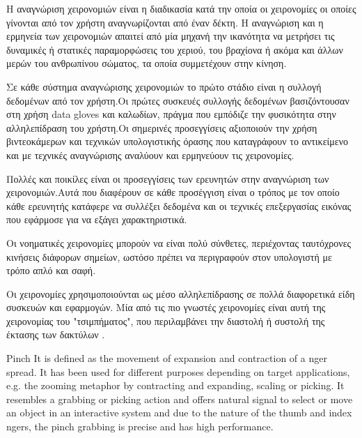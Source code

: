 
H αναγνώριση χειρονομιών είναι η διαδικασία κατά την οποία οι χειρονομίες οι οποίες γίνονται από τον χρήστη αναγνωρίζονται από έναν δέκτη. Η αναγνώριση και η ερμηνεία των χειρονομιών απαιτεί από μία μηχανή την ικανότητα να μετρήσει τις δυναμικές ή στατικές παραμορφώσεις του χεριού, του βραχίονα ή ακόμα και άλλων μερών του ανθρωπίνου σώματος, τα οποία συμμετέχουν στην κίνηση.

Σε κάθε σύστημα αναγνώρισης χειρονομιών το πρώτο στάδιο είναι η συλλογή δεδομένων από τον χρήστη.Οι πρώτες συσκευές συλλογής δεδομένων βασιζόντουσαν στη χρήση data gloves και καλωδίων, πράγμα που εμπόδιζε την φυσικότητα στην αλληλεπίδραση του χρήστη.Οι σημερινές προσεγγίσεις αξιοποιούν την χρήση βιντεοκάμερων και τεχνικών υπολογιστικής όρασης που καταγράφουν το αντικείμενο και με τεχνικές αναγνώρισης αναλύουν και ερμηνεύουν τις χειρονομίες.

Πολλές και ποικίλες είναι οι προσεγγίσεις των ερευνητών στην αναγνώριση των χειρονομιών.Αυτά που διαφέρουν σε κάθε προσέγγιση είναι ο τρόπος με τον οποίο κάθε ερευνητής κατάφερε να συλλέξει δεδομένα και οι τεχνικές επεξεργασίας εικόνας που εφάρμοσε για να εξάγει χαρακτηριστικά.

Οι νοηματικές χειρονομίες μπορούν να είναι πολύ σύνθετες, περιέχοντας ταυτόχρονες κινήσεις διάφορων σημείων, ωστόσο πρέπει να περιγραφούν στον υπολογιστή με τρόπο απλό και σαφή.

Οι χειρονομίες χρησιμοποιούνται ως μέσο αλληλεπίδρασης σε πολλά διαφορετικά είδη συσκευών και εφαρμογών. Μία από τις πιο γνωστές χειρονομίες είναι αυτή της χειρονομίας του "τσιμπήματος", που περιλαμβάνει την διαστολή ή συστολή της έκτασης των δακτύλων \cite{hoggan2013multi}.


Pinch It is defined as the movement of expansion and contraction of a nger spread. It has been used for different purposes depending on target applications, e.g. the zooming metaphor by contracting and expanding, scaling or picking. It resembles a grabbing or picking action and offers natural signal to select or move an object in an interactive system and due to the nature of the thumb and index ngers, the pinch grabbing is precise and has high performance.


